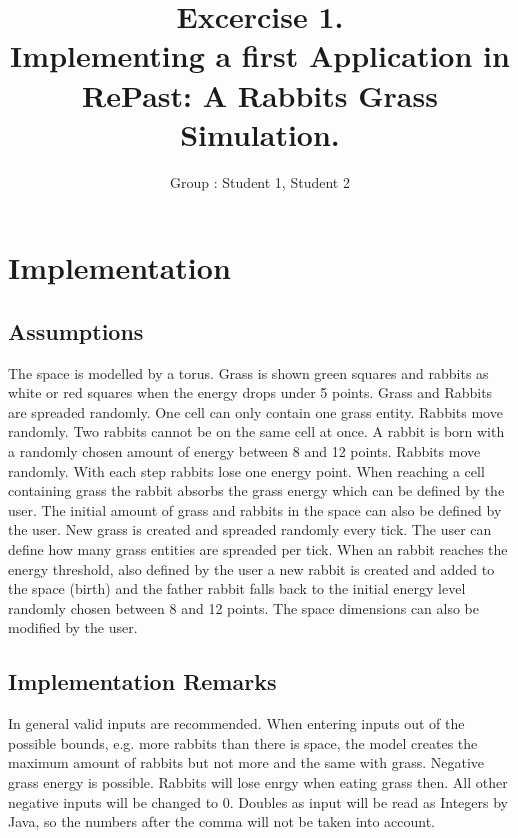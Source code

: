 \documentclass[11pt]{article}
\title{\bf Excercise 1.\\ Implementing a first Application in RePast: A Rabbits Grass Simulation.}
\author{Group \textnumero: Student 1, Student 2}
\begin{document}
\maketitle

\section{Implementation}

\subsection{Assumptions}
The space is modelled by a torus. Grass is shown green squares and rabbits as white or red squares when the energy drops under 5 points. 
Grass and Rabbits are spreaded randomly. One cell can only contain one grass entity. Rabbits move randomly. Two rabbits cannot be on the same cell at once. A rabbit is born with a randomly chosen amount of energy between 8 and 12 points. Rabbits move randomly. With each step rabbits lose one energy point. When reaching a cell containing grass the rabbit absorbs the grass energy which can be defined by the user. The initial amount of grass and rabbits in the space can also be defined by the user. New grass is created and spreaded randomly every tick. The user can define how many grass entities are spreaded per tick. When an rabbit reaches the energy threshold, also defined by the user a new rabbit is created and added to the space (birth) and the father rabbit falls back to the initial energy level randomly chosen between 8 and 12 points. The space dimensions can also be modified by the user.


\subsection{Implementation Remarks}
In general valid inputs are recommended. When entering inputs out of the possible bounds, e.g. more rabbits than there is space, the model creates the maximum amount of rabbits but not more and the same with grass. Negative grass energy is possible. Rabbits will lose enrgy when eating grass then. All other negative inputs will be changed to 0. Doubles as input will be read as Integers by Java, so the numbers after the comma will not be taken into account. 
\end{document}
